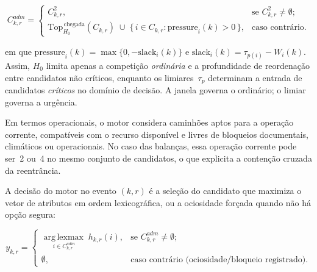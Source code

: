 \documentclass[
  12pt,
  oneside,
  a4paper,
  sumario=tradicional,
  brazil
]{abntex2}
\begin{document}
\begin{equation}
C^{adm}_{k,r} =
\begin{cases}
  C^{2}_{k,r}, & \text{se } C^{2}_{k,r} \neq \emptyset; \\[2pt]
  \mathrm{Top}^{\,\text{chegada}}_{H_0}(C_{k,r}) \;\cup\;
  \{\, i \in C_{k,r} : \mathrm{pressure}_i(k) > 0 \,\}, & \text{caso contr\'ario.}
\end{cases}
\label{eq:cadm}
\end{equation}

\noindent em que $\mathrm{pressure}_i(k) = \max\{0, -\mathrm{slack}_i(k)\}$ e $\mathrm{slack}_i(k) = \tau_{p(i)} - W_i(k)$. Assim, $H_0$ limita apenas a competi\c{c}\~ao \emph{ordin\'aria} e a profundidade de reordena\c{c}\~ao entre candidatos n\~ao cr\'iticos, enquanto os limiares~$\tau_p$ determinam a entrada de candidatos \emph{cr\'iticos} no dom\'inio de decis\~ao. A janela governa o ordin\'ario; o limiar governa a urg\^encia.

Em termos operacionais, o motor considera caminh\~oes aptos para a opera\c{c}\~ao corrente, compat\'iveis com o recurso dispon\'ivel e livres de bloqueios documentais, clim\'aticos ou operacionais. No caso das balan\c{c}as, essa opera\c{c}\~ao corrente pode ser~2 ou~4 no mesmo conjunto de candidatos, o que explicita a conten\c{c}\~ao cruzada da reentr\^ancia.

A decis\~ao do motor no evento $(k,r)$ \'e a sele\c{c}\~ao do candidato que maximiza o vetor de atributos em ordem lexicogr\'afica, ou a ociosidade for\c{c}ada quando n\~ao h\'a op\c{c}\~ao segura:

\begin{equation}
y_{k,r} =
\begin{cases}
  \displaystyle \operatorname*{arg\,lexmax}_{\,i \in C^{adm}_{k,r}}\;
  h_{k,r}(i), & \text{se } C^{adm}_{k,r} \neq \emptyset; \\[6pt]
  \emptyset, & \text{caso contr\'ario (ociosidade/bloqueio registrado).}
\end{cases}
\label{eq:selecao}
\end{equation}
\end{document}

